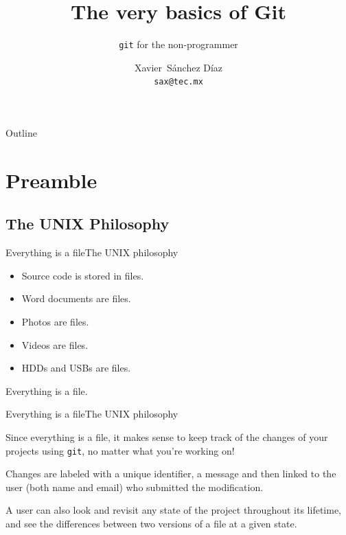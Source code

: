 \documentclass[dvipsnames, usenames]{beamer}
\title{The very basics of Git}
\subtitle{\texttt{git} for the non-programmer}
\author[X. Sánchez Díaz]{Xavier~Sánchez Díaz\\\texttt{sax@tec.mx}}
\institute[ITESM]{Research Group with Strategic Focus on Intelligent Systems\\
Tecnológico de Monterrey, Campus Monterrey}
\date{}
\newcommand{\spacepls}{\vspace{1.5Ex}}
\begin{document}
\begin{frame}
	\titlepage
\end{frame}

\begin{frame}%
	{Outline}
	\tableofcontents
\end{frame}

\section{Preamble} %
\label{sec:preamble}

\subsection{The UNIX Philosophy} %
\label{sec:philosophy}

\begin{frame}{Everything is a file}{The UNIX philosophy}

	\spacepls

	\begin{itemize}
		\item Source code is stored in files. \pause
		\item Word documents are files. \pause
		\item Photos are files. \pause
		\item Videos are files. \pause
		\item HDDs and USBs are files. \pause
	\end{itemize}

	\spacepls
	{\huge Everything \pause is \pause a \pause file.}\\
\end{frame}

\begin{frame}{Everything is a file}{The UNIX philosophy}

	\spacepls

	Since everything is a file, it makes sense to keep track of the changes of your projects using \texttt{git}, no matter what you're working on!

	Changes are labeled with a unique identifier, a message and then linked to the user (both name and email) who submitted the modification.
	
	A user can also look and revisit any state of the project throughout its lifetime, and see the differences between two versions of a file at a given state.
	
\end{frame}
\end{document}
